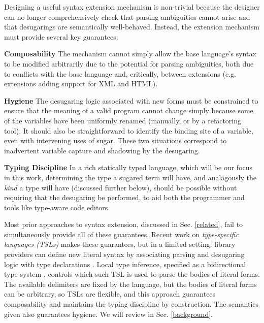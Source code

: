 \documentclass{sig-alternate}[10pt]
\begin{document}
Designing a useful syntax extension mechanism is non-trivial because the designer can no longer  comprehensively check that parsing ambiguities cannot arise and that desugarings are semantically well-behaved. Instead, the extension mechanism must provide several key guarantees:


\textbf{Composability} The mechanism cannot simply allow the base language's syntax to  be modified arbitrarily due to the potential for parsing ambiguities, both due to conflicts with the base language and, critically, between extensions (e.g. extensions adding support for XML and HTML).%


\textbf{Hygiene} The desugaring logic associated with new forms must be constrained to ensure that the meaning of a valid program cannot change simply because some of the variables have been uniformly renamed (manually, or by a refactoring tool). It should also be straightforward to identify the binding site of a variable, even with intervening uses of sugar. These two situations correspond to inadvertent variable capture and shadowing by the desugaring. 


\textbf{Typing Discipline} In a rich statically typed language, which will be our focus in this work,  determining the type a sugared term will have, and analagously the \emph{kind} a type will have (discussed further below), should be possible without requiring that the desugaring be performed, to aid both the programmer and tools like type-aware code editors. 

Most prior approaches to syntax extension, discussed in Sec. \ref{related}, fail to simultaneously provide all of these guarantees. Recent work on \emph{type-specific languages  (TSLs)} makes these guarantees, but in a limited setting: library providers can define new literal syntax by associating parsing and desugaring logic with type declarations \cite{TSLs}. Local type inference, specified as a bidirectional type system \cite{Pierce:2000:LTI:345099.345100}, controls which such TSL is used to parse  the  bodies of literal forms. The available delimiters are fixed by the language, but the bodies of literal forms can be arbitrary, so TSLs are flexible, and this approach guarantees composability and maintains the typing discipline by construction. The semantics given also guarantees hygiene. We will review in Sec. \ref{background}. 
\end{document}
